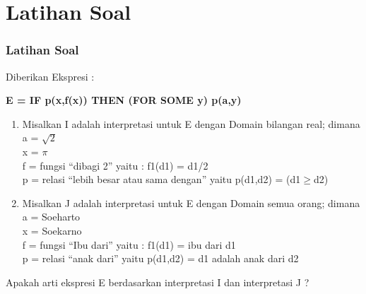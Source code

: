 \documentclass[handout]{beamer}
\theoremstyle{definition}
\theoremstyle{example}
\begin{document}
\section{Latihan Soal}
\begin{frame}
	\frametitle{Latihan Soal}
	 Diberikan Ekspresi :\\
	 \begin{center}
	   \textbf{E = IF p(x,f(x)) THEN (FOR SOME y) p(a,y)}
	\end{center}
	\begin{enumerate}
		\item Misalkan I adalah interpretasi untuk E dengan Domain bilangan real; dimana\\ 
		a = $\sqrt{2}$\\
		x = $\pi$\\
		f = fungsi “dibagi 2” yaitu : f1(d1) = d1/2\\
		p  = relasi “lebih besar atau sama dengan” yaitu p(d1,d2) = (d1$\geq$d2)
		\item  Misalkan J adalah interpretasi untuk E dengan Domain semua orang; dimana\\ 
		a = Soeharto\\
		x = Soekarno\\
		f = fungsi “Ibu dari” yaitu : f1(d1) = ibu dari d1\\
		p  = relasi “anak dari” yaitu p(d1,d2) = d1 adalah anak dari d2
		
	\end{enumerate}
	Apakah arti ekspresi E berdasarkan interpretasi I dan interpretasi J ?
\end{frame}			
\end{document}
